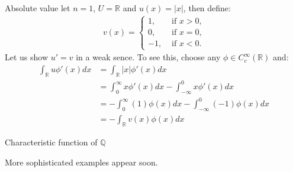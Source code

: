 \begin{example}{Absolute value}
  let $n=1$, $U=\mathbb{R}$ and $u(x)=|x|$, then define:
  \begin{align*}
    v(x)= 
    \begin{cases}
      1, &\text{ if } x > 0 \text{,} \\
      0, &\text{ if } x = 0\text{,}\\
      -1, &\text{ if } x <  0.
    \end{cases}
  \end{align*}
  Let us show $u'=v$ in a weak sence. To see this, choose any $\phi\in C^{\infty}_{c}(\mathbb{R})$ and:
  \begin{align*}
    \int_{\mathbb{R}}u\phi'(x)dx&=\int_{\mathbb{R}} |x|\phi'(x)dx\\
    &=\int_{0}^{\infty}x\phi'(x)dx-\int_{-\infty}^{0}x\phi'(x)dx\\
    &=-\int_{0}^{\infty}(1)\phi(x)dx - \int_{-\infty}^{0}(-1)\phi(x)dx\\
    &=-\int_{\mathbb{R}}v(x)\phi(x)dx
  \end{align*}
\end{example}
\begin{example}{Characteristic function of $\mathbb{Q}$}
  
\end{example}
More sophisticated examples appear soon.
